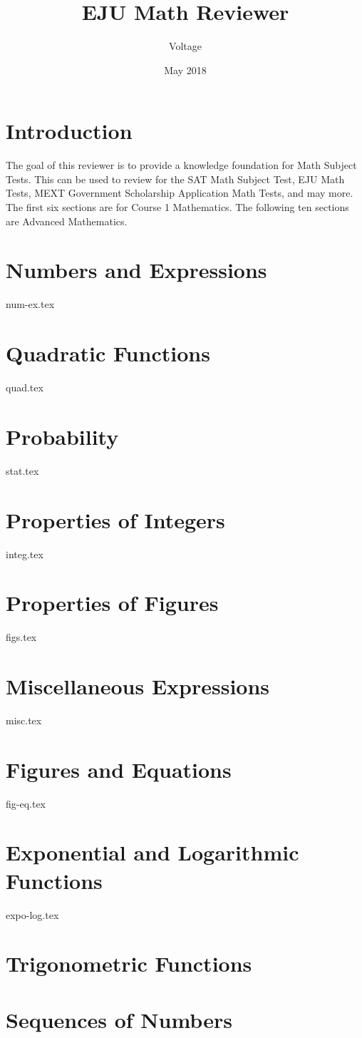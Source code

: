 \documentclass{mext-rev}
\title{EJU Math Reviewer}
\author{Voltage}
\date{May 2018}
\newcommand{\importref}[1]{\label{#1}{#1.tex}}
\begin{document}
\section*{Introduction}
The goal of this reviewer is to provide a knowledge foundation for Math Subject Tests.
This can be used to review for the SAT Math Subject Test, EJU Math Tests, MEXT Government Scholarship Application Math Tests, and may more.
The first six sections are for Course 1 Mathematics.
The following ten sections are Advanced Mathematics.

\section{Numbers and Expressions}\importref{num-ex}
\section{Quadratic Functions}\importref{quad}
\section{Probability}\importref{stat}
\section{Properties of Integers}\importref{integ}
\section{Properties of Figures}\importref{figs}
\section{Miscellaneous Expressions}\importref{misc}
\section{Figures and Equations}\importref{fig-eq}
\section{Exponential and Logarithmic Functions}\importref{expo-log}
\section{Trigonometric Functions}\label{trig}\lipsum[2]
\section{Sequences of Numbers}\label{seq}\lipsum[2]
\end{document}
